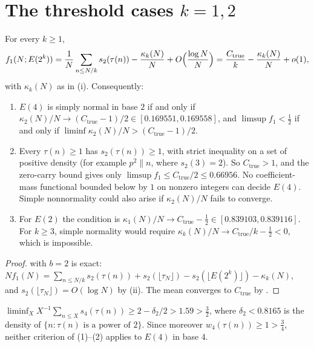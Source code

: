 \documentclass[11pt]{article}
\newcommand{\Ctrue}{C_{\mathrm{true}}}
\begin{document}
\section{\texorpdfstring{The threshold cases $k=1,2$}{The threshold cases k = 1, 2}}\label{sec:boundary}

\begin{theorem}\label{thm:E4}
For every $k\ge1$,
\[
f_1(N;E(2^k))=\frac1N\sum_{n\le N/k}s_2(\tau(n))-\frac{\kappa_k(N)}N+O\Bigl(\frac{\log N}N\Bigr)=\frac{\Ctrue}k-\frac{\kappa_k(N)}N+o(1),
\]
with $\kappa_k(N)$ as in (i). Consequently:
\begin{enumerate}[label=\textup{(\arabic*)},nosep]
\item $E(4)$ is simply normal in base $2$ if and only if $\kappa_2(N)/N\to(\Ctrue-1)/2\in[0.169551,0.169558]$, and $\limsup f_1<\frac12$ if and only if $\liminf\kappa_2(N)/N>(\Ctrue-1)/2$.
\item Every $\tau(n)\ge1$ has $s_2(\tau(n))\ge1$, with strict inequality on a set of positive density (for example $p^2\parallel n$, where $s_2(3)=2$). So $\Ctrue>1$, and the zero-carry bound gives only $\limsup f_1\le\Ctrue/2\le0.66956$. No coefficient-mass functional bounded below by $1$ on nonzero integers can decide $E(4)$. Simple nonnormality could also arise if $\kappa_2(N)/N$ fails to converge.
\item For $E(2)$ the condition is $\kappa_1(N)/N\to\Ctrue-\frac12\in[0.839103,0.839116]$. For $k\ge3$, simple normality would require $\kappa_k(N)/N\to\Ctrue/k-\frac12<0$, which is impossible.
\end{enumerate}
\end{theorem}

\begin{proof}
 with $b=2$ is exact: $Nf_1(N)=\sum_{n\le N/k}s_2(\tau(n))+s_2(\lfloor\tau_N\rfloor)-s_2(\lfloor E(2^k)\rfloor)-\kappa_k(N)$, and $s_2(\lfloor\tau_N\rfloor)=O(\log N)$ by (ii). The mean converges to $\Ctrue$ by .
\end{proof}

\begin{proposition}\label{prop:base4}
$\liminf_XX^{-1}\sum_{n\le X}s_4(\tau(n))\ge2-\delta_2/2>1.59>\frac32$, where $\delta_2<0.8165$ is the density of $\{n:\tau(n)\text{ is a power of }2\}$. Since moreover $w_4(\tau(n))\ge1>\frac34$, neither criterion of (1)--(2) applies to $E(4)$ in base $4$.
\end{proposition}
\end{document}
